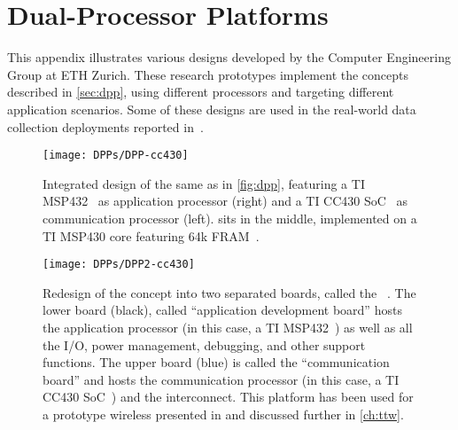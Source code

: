 \begin{subappendices}
\begin{itemize}
\end{itemize}

%

\newpage
\section{Dual-Processor Platforms}
\label{append:dpp}

This appendix illustrates various \DPP designs developed by the Computer Engineering Group at ETH Zurich.
These research prototypes implement the \DPP concepts described in \cref{sec:dpp}, using different processors and targeting different application scenarios. Some of these designs are used in the real-world data collection deployments reported \eg in~\cite{weber2019decade,meyer2019IPSN}.

\vspace{1cm}

\begin{figure}[h]
	\centering
	\texttt{[image: DPPs/DPP-cc430]}
	\caption{Integrated design of the same \DPP as in \cref{fig:dpp}, featuring a TI MSP432~\cite{msp432} as application processor (right) and a TI CC430 SoC~\cite{CC430F6137} as communication processor (left). \bolt sits in the middle, implemented on a TI MSP430 core featuring
64k FRAM~\cite{msp432FR}.}
	\label{fig:dpp-cc430}
\end{figure}

\begin{figure}[!b]
	\centering
	\texttt{[image: DPPs/DPP2-cc430]}
	\caption{Redesign of the \DPP concept into two separated boards, called the \DPPtwo~\cite{beutel2019DPPdemo}. The lower board (black), called ``application development board'' hosts the application processor (in this case, a TI MSP432~\cite{msp432}) as well as all the I/O, power management, debugging, and other support functions. The upper board (blue) is called the ``communication board'' and hosts the communication processor (in this case, a TI CC430 SoC~\cite{CC430F6137}) and the \bolt interconnect.
	This platform has been used for a prototype wireless \CPS presented in \cite{mager2019Feedback, mager2019Demo} and discussed further in \cref{ch:ttw}.}
	\label{fig:dpp2-cc430}
\end{figure}


\end{subappendices}

